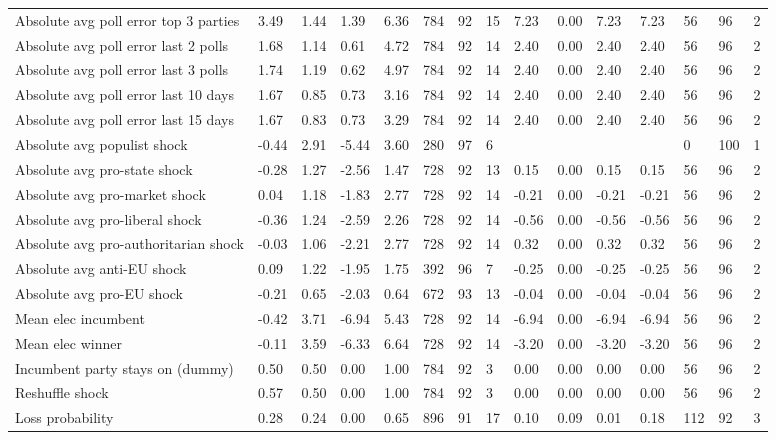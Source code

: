 \begin{longtable}{lllllllllllllll}
Absolute avg poll error top 3 parties & 3.49 & 1.44 & 1.39 & 6.36 & 784 & 92 & 15 & 7.23 & 0.00 & 7.23 & 7.23 & 56 & 96 & 2\\
\addlinespace
Absolute avg poll error last 2 polls & 1.68 & 1.14 & 0.61 & 4.72 & 784 & 92 & 14 & 2.40 & 0.00 & 2.40 & 2.40 & 56 & 96 & 2\\
Absolute avg poll error last 3 polls & 1.74 & 1.19 & 0.62 & 4.97 & 784 & 92 & 14 & 2.40 & 0.00 & 2.40 & 2.40 & 56 & 96 & 2\\
Absolute avg poll error last 10 days & 1.67 & 0.85 & 0.73 & 3.16 & 784 & 92 & 14 & 2.40 & 0.00 & 2.40 & 2.40 & 56 & 96 & 2\\
Absolute avg poll error last 15 days & 1.67 & 0.83 & 0.73 & 3.29 & 784 & 92 & 14 & 2.40 & 0.00 & 2.40 & 2.40 & 56 & 96 & 2\\
Absolute avg populist shock & -0.44 & 2.91 & -5.44 & 3.60 & 280 & 97 & 6 &  &  &  &  & 0 & 100 & 1\\
\addlinespace
Absolute avg pro-state shock & -0.28 & 1.27 & -2.56 & 1.47 & 728 & 92 & 13 & 0.15 & 0.00 & 0.15 & 0.15 & 56 & 96 & 2\\
Absolute avg pro-market shock & 0.04 & 1.18 & -1.83 & 2.77 & 728 & 92 & 14 & -0.21 & 0.00 & -0.21 & -0.21 & 56 & 96 & 2\\
Absolute avg pro-liberal shock & -0.36 & 1.24 & -2.59 & 2.26 & 728 & 92 & 14 & -0.56 & 0.00 & -0.56 & -0.56 & 56 & 96 & 2\\
Absolute avg pro-authoritarian shock & -0.03 & 1.06 & -2.21 & 2.77 & 728 & 92 & 14 & 0.32 & 0.00 & 0.32 & 0.32 & 56 & 96 & 2\\
Absolute avg anti-EU shock & 0.09 & 1.22 & -1.95 & 1.75 & 392 & 96 & 7 & -0.25 & 0.00 & -0.25 & -0.25 & 56 & 96 & 2\\
\addlinespace
Absolute avg pro-EU shock & -0.21 & 0.65 & -2.03 & 0.64 & 672 & 93 & 13 & -0.04 & 0.00 & -0.04 & -0.04 & 56 & 96 & 2\\
Mean elec incumbent & -0.42 & 3.71 & -6.94 & 5.43 & 728 & 92 & 14 & -6.94 & 0.00 & -6.94 & -6.94 & 56 & 96 & 2\\
Mean elec winner & -0.11 & 3.59 & -6.33 & 6.64 & 728 & 92 & 14 & -3.20 & 0.00 & -3.20 & -3.20 & 56 & 96 & 2\\
Incumbent party stays on (dummy) & 0.50 & 0.50 & 0.00 & 1.00 & 784 & 92 & 3 & 0.00 & 0.00 & 0.00 & 0.00 & 56 & 96 & 2\\
Reshuffle shock & 0.57 & 0.50 & 0.00 & 1.00 & 784 & 92 & 3 & 0.00 & 0.00 & 0.00 & 0.00 & 56 & 96 & 2\\
\addlinespace
Loss probability & 0.28 & 0.24 & 0.00 & 0.65 & 896 & 91 & 17 & 0.10 & 0.09 & 0.01 & 0.18 & 112 & 92 & 3\\

\end{longtable}
